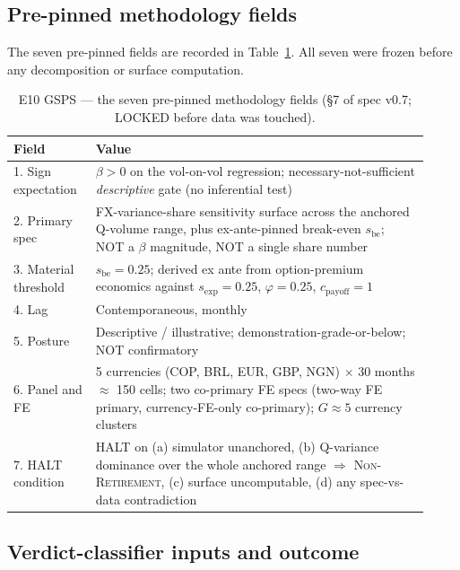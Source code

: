 \documentclass[11pt,letterpaper]{article}
\newcommand{\sbe}{s_{\mathrm{be}}}
\newcommand{\sexp}{s_{\mathrm{exp}}}
\theoremstyle{assumption}
\begin{document}
\subsection{Pre-pinned methodology fields}
\label{sec:e10-prepin}

The seven pre-pinned fields are recorded in Table~\ref{tab:e10-prepin}.
All seven were frozen before any decomposition or surface computation.

\begin{table}[h]
\centering
\caption{E10 GSPS --- the seven pre-pinned methodology fields
  (\S7 of spec v0.7; LOCKED before data was touched).}
\label{tab:e10-prepin}
\small
\begin{tabular}{p{0.18\linewidth}p{0.74\linewidth}}
\toprule
Field & Value \\
\midrule
1. Sign expectation
  & $\beta > 0$ on the vol-on-vol regression; necessary-not-sufficient
    \emph{descriptive} gate (no inferential test) \\
2. Primary spec
  & FX-variance-share sensitivity surface across the anchored Q-volume
    range, plus ex-ante-pinned break-even $\sbe$; NOT a $\beta$ magnitude,
    NOT a single share number \\
3. Material threshold
  & $\sbe = 0.25$; derived ex ante from option-premium economics against
    $\sexp = 0.25$, $\varphi = 0.25$, $c_{\mathrm{payoff}} = 1$ \\
4. Lag
  & Contemporaneous, monthly \\
5. Posture
  & Descriptive / illustrative; demonstration-grade-or-below; NOT
    confirmatory \\
6. Panel and FE
  & 5 currencies (COP, BRL, EUR, GBP, NGN) $\times$ 30 months $\approx$
    150 cells; two co-primary FE specs (two-way FE primary, currency-FE-only
    co-primary); $G \approx 5$ currency clusters \\
7. HALT condition
  & HALT on (a) simulator unanchored, (b) Q-variance dominance over the
    whole anchored range $\Rightarrow$ \textsc{Non-Retirement},
    (c) surface uncomputable, (d) any spec-vs-data contradiction \\
\bottomrule
\end{tabular}
\end{table}

\subsection{Verdict-classifier inputs and outcome}
\label{sec:e10-verdict}
\end{document}
